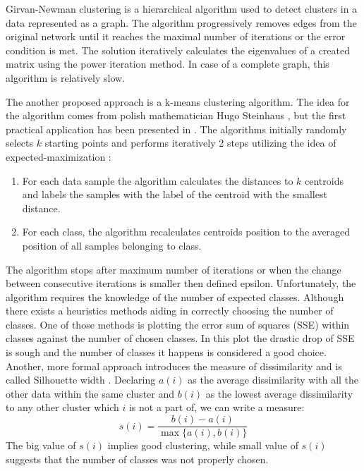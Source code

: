 Girvan-Newman clustering is a hierarchical algorithm used to detect clusters in a data represented as a graph.
The algorithm progressively removes edges from the original network until it reaches the maximal number of iterations or the error condition is met.
The solution iteratively calculates the eigenvalues of a created matrix using the power iteration method. 
In case of a complete graph, this algorithm is relatively slow.

The another proposed approach is a k-means clustering algorithm.
The idea for the algorithm comes from polish mathematician Hugo Steinhaus \cite{kmeans1}, but the first practical application has been presented in \cite{kmeans2}.
The algorithms initially randomly selects $k$ starting points and performs iteratively 2 steps utilizing the idea of expected-maximization \cite{expectedmaximization}:
\begin{enumerate}
\item For each data sample the algorithm calculates the distances to $k$ centroids and labels the samples with the label of the centroid with the smallest distance.
\item For each class, the algorithm recalculates centroids position to the averaged position of all samples belonging to class.
\end{enumerate} 
The algorithm stops after maximum number of iterations or when the change between consecutive iterations is smaller then defined epsilon.
Unfortunately, the algorithm requires the knowledge of the number of expected classes.
Although there exists a heuristics methods aiding in correctly choosing the number of classes. 
One of those methods is plotting the error sum of squares (SSE) within classes against the number of chosen classes. 
In this plot the drastic drop of SSE is sough and the number of classes it happens is considered a good choice.
Another, more formal approach introduces the measure of dissimilarity and is called Silhouette width \cite{silhouette}.
Declaring $a(i)$ as the average dissimilarity with all the other data within the same cluster and $b(i)$ as the lowest average dissimilarity to any other cluster which $i$ is not a part of, we can write a measure:
\begin{equation}
s(i) = \frac{b(i) - a(i)}{\max{\{a(i),b(i)}\}}
\end{equation}
The big value of $s(i)$ implies good clustering, while small value of $s(i)$ suggests that the number of classes was not properly chosen.






